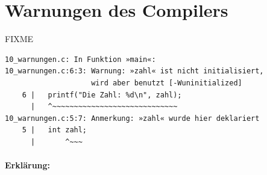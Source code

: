 \section{Warnungen des Compilers}
\label{sec:c:warnungen}

FIXME


\small
\begin{verbatim}
10_warnungen.c: In Funktion »main«:
10_warnungen.c:6:3: Warnung: »zahl« ist nicht initialisiert, 
                    wird aber benutzt [-Wuninitialized]
    6 |   printf("Die Zahl: %d\n", zahl);
      |   ^~~~~~~~~~~~~~~~~~~~~~~~~~~~~~
10_warnungen.c:5:7: Anmerkung: »zahl« wurde hier deklariert
    5 |   int zahl;
      |       ^~~~
\end{verbatim}
\normalsize

\paragraph{Erklärung:}





